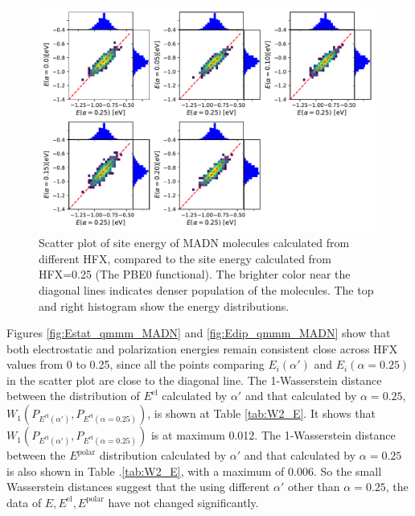 \documentclass[letterpaper,12pt]{article}
\begin{document}
\begin{figure}[H]
    \centering
    \includegraphics[width=0.99\textwidth]{figs/scatterE_qmmm.pdf}
    \caption{Scatter plot of site energy of MADN molecules calculated from different HFX, compared to the site energy calculated from HFX=0.25 (The PBE0 functional). The brighter color near the diagonal lines indicates denser population of the molecules.  The top and right histogram show the energy distributions.}
    \label{fig:E_qmmm_MADN}
\end{figure}


Figures \ref{fig:Estat_qmmm_MADN} and \ref{fig:Edip_qmmm_MADN} show that both electrostatic and polarization energies remain consistent close across HFX values from 0 to 0.25, since all the points comparing $E_i(\alpha')$ and $E_i(\alpha=0.25)$ in the scatter plot are close to the diagonal line.
The 1-Wasserstein distance between the distribution of $E^\text{el}$ calculated by $\alpha'$ and that calculated by $\alpha=0.25$, $W_1(P_{E^\text{el}(\alpha')}, P_{E^\text{el}(\alpha=0.25)})$, is shown at Table \ref{tab:W2_E}. It shows that $W_1(P_{E^\text{el}(\alpha')}, P_{E^\text{el}(\alpha=0.25)})$ is at maximum 0.012. The 1-Wasserstein distance between the $E^\text{polar}$ distribution calculated by $\alpha'$ and that calculated by $\alpha=0.25$ is also shown in Table .\ref{tab:W2_E}, with a maximum of 0.006. So the small Wasserstein distances suggest that the using different $\alpha'$ other than $\alpha=0.25$, the data of $E, E^\text{el}, E^\text{polar}$ have not changed significantly.
\end{document}
